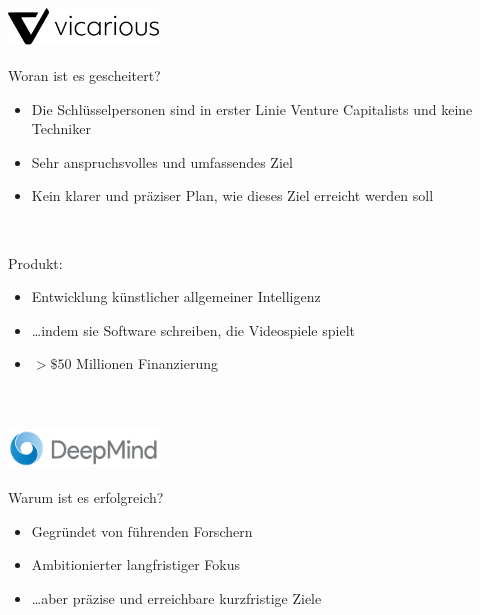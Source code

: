 \documentclass[handout]{beamer}
\begin{document}
\begin{frame}
    \frametitle{\includegraphics[width=0.3\textwidth]{vicarious.png}}
    Woran ist es gescheitert? \\
    \begin{itemize}
        \item<1-> Die Schlüsselpersonen sind in erster Linie Venture Capitalists und keine Techniker
        \item<2-> Sehr anspruchsvolles und umfassendes Ziel
        \item<3-> Kein klarer und präziser Plan, wie dieses Ziel erreicht werden soll
    \end{itemize} ~\\
\end{frame}

\begin{frame}
    Produkt: \\
    \begin{itemize}
        \item<1-> Entwicklung künstlicher allgemeiner Intelligenz
        \item<2-> \dots indem sie Software schreiben, die Videospiele spielt
        \item<3-> $>\$50$ Millionen Finanzierung
    \end{itemize} ~\\
\end{frame}

\begin{frame}
    \frametitle{\includegraphics[width=0.3\textwidth]{deepmind.png}}
    Warum ist es erfolgreich? \\
    \begin{itemize}
        \item<1-> Gegründet von führenden Forschern
        \item<2-> Ambitionierter langfristiger Fokus
        \item<3-> \dots aber präzise und erreichbare kurzfristige Ziele
    \end{itemize} ~\\
\end{frame}
\end{document}
